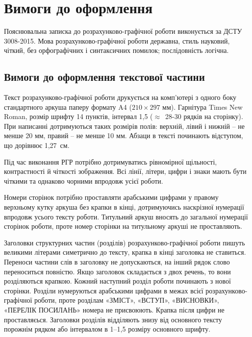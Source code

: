 \chapter{Вимоги до оформлення}

Пояснювальна записка до розрахунково-графічної роботи ви\-ко\-ну\-єть\-ся за ДСТУ 3008-2015. Мова розрахунково-графічної роботи державна, стиль науковий, чіткий, без орфографічних і синтаксичних помилок; послідовність ло\-гіч\-на.


\section{Вимоги до оформлення текстової частини}

Текст розрахунково-графічної роботи друкується на комп’ютері з одного боку стандартного аркуша паперу формату A4 ($210\!
\times\!297$ мм). Гарнітура Times New Roman, розмір шрифту 14 пунктів, інтервал 1,5 ($\approx$~28-30 рядків на сторінку). При написанні дотримуються таких розмірів полів: верхній, лівий і нижній -- не менше 20 мм, правий -- не менше 10 мм. Абзаци в тексті починають відступом, що дорівнює 1,27~см.

Під час виконання РГР потрібно дотримуватись рівномірної щільності, контрастності й чіткості зображення. Всі лінії, літери, цифри і знаки мають бути чіткими та однаково чорними впродовж усієї роботи.

Номери сторінок потрібно проставляти арабськими цифрами у правому верхньому кутку аркуша без крапки в кінці, дотримуючись наскрізної нумерації впродовж усього тексту роботи. Титульний аркуш вносять до загальної нумерації сторінок роботи, проте номер сторінки на титульному аркуші не проставляють.

Заголовки структурних частин (розділів) розрахунково-графічної роботи пишуть великими літерами симетрично до тексту, крапка в кінці заголовка не ставиться. Переноси частини слів в заголовку не допускаються, на інший рядок слово переноситься повністю. Якщо заголовок складається з двох речень, то вони розділяються крапкою. Кожний наступний розділ роботи починають з нової сторінки. Розділи нумеруються арабськими цифрами в межах всієї розрахунково-графічної роботи, проте розділам «ЗМІСТ», «ВСТУП», «ВИСНОВКИ», «ПЕРЕЛІК ПОСИЛАНЬ» номера не присвоюють. Крапка після цифри не проставляєься. Заголовки розділів відділяють знизу від основного тексту порожнім рядком або інтервалом в 1--1,5 розміру основного шрифту.

